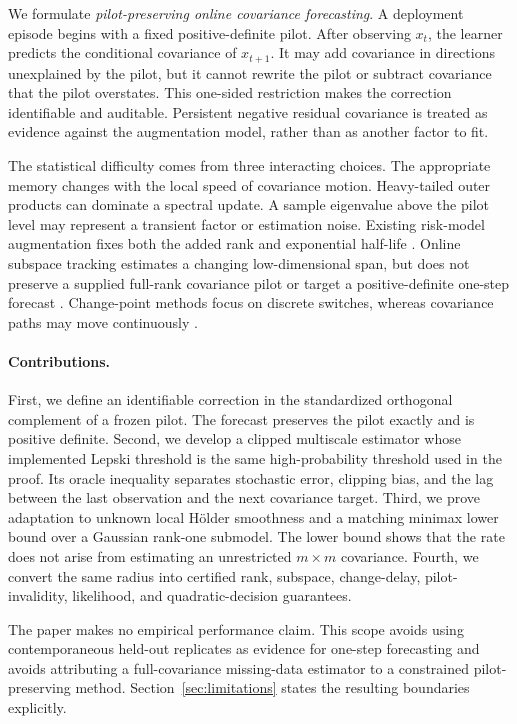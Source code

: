 \documentclass{article}
\theoremstyle{definition}
\theoremstyle{remark}
\begin{document}
We formulate \emph{pilot-preserving online covariance forecasting}. A deployment episode begins with a fixed positive-definite pilot. After observing $x_t$, the learner predicts the conditional covariance of $x_{t+1}$. It may add covariance in directions unexplained by the pilot, but it cannot rewrite the pilot or subtract covariance that the pilot overstates. This one-sided restriction makes the correction identifiable and auditable. Persistent negative residual covariance is treated as evidence against the augmentation model, rather than as another factor to fit.

The statistical difficulty comes from three interacting choices. The appropriate memory changes with the local speed of covariance motion. Heavy-tailed outer products can dominate a spectral update. A sample eigenvalue above the pilot level may represent a transient factor or estimation noise. Existing risk-model augmentation fixes both the added rank and exponential half-life \citep{tzikas2026}. Online subspace tracking estimates a changing low-dimensional span, but does not preserve a supplied full-rank covariance pilot or target a positive-definite one-step forecast \citep{balzano2010,narayanamurthy2018,zhu2022}. Change-point methods focus on discrete switches, whereas covariance paths may move continuously \citep{adams2007,altamirano2023,puchkin2023}.

\paragraph{Contributions.}
First, we define an identifiable correction in the standardized orthogonal complement of a frozen pilot. The forecast preserves the pilot exactly and is positive definite. Second, we develop a clipped multiscale estimator whose implemented Lepski threshold is the same high-probability threshold used in the proof. Its oracle inequality separates stochastic error, clipping bias, and the lag between the last observation and the next covariance target. Third, we prove adaptation to unknown local H\"older smoothness and a matching minimax lower bound over a Gaussian rank-one submodel. The lower bound shows that the rate does not arise from estimating an unrestricted $m\times m$ covariance. Fourth, we convert the same radius into certified rank, subspace, change-delay, pilot-invalidity, likelihood, and quadratic-decision guarantees.

The paper makes no empirical performance claim. This scope avoids using contemporaneous held-out replicates as evidence for one-step forecasting and avoids attributing a full-covariance missing-data estimator to a constrained pilot-preserving method. Section~\ref{sec:limitations} states the resulting boundaries explicitly.
\end{document}
